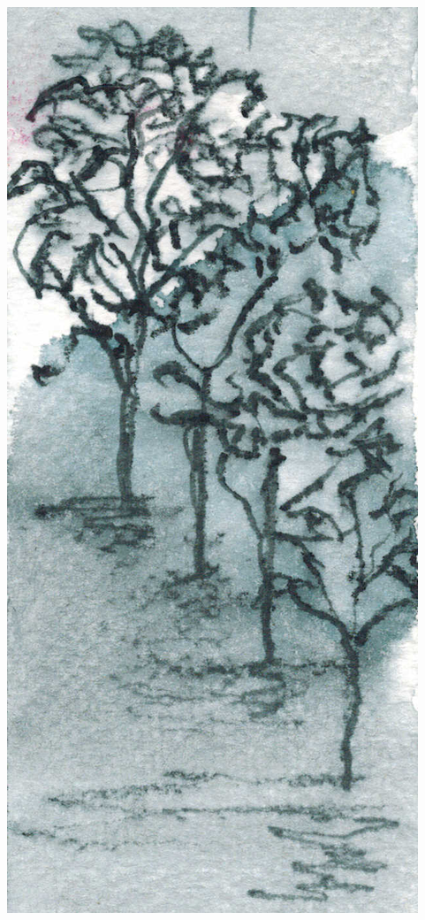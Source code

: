 \begin{titlepage}

\begin{center}
\includegraphics[scale=0.8]{./presentation/arbres}
\end{center}


\end{titlepage}
